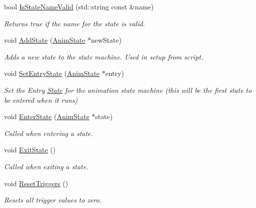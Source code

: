\begin{DoxyCompactItemize}
bool \hyperlink{classAnimatorController_ac079dc6e19c4284fa941033577ddd45d}{Is\+State\+Name\+Valid} (std\+::string const \&name)
\begin{DoxyCompactList}\small\item\em Returns true if the name for the state is valid. \end{DoxyCompactList}\item 
void \hyperlink{classAnimatorController_a7e2acba88b4bc663c3bc3a04c20962c8}{Add\+State} (\hyperlink{structAnimState}{Anim\+State} $\ast$new\+State)
\begin{DoxyCompactList}\small\item\em Adds a new state to the state machine. Used in setup from script. \end{DoxyCompactList}\item 
void \hyperlink{classAnimatorController_adec385ab87a34b0919a040b1540f8b86}{Set\+Entry\+State} (\hyperlink{structAnimState}{Anim\+State} $\ast$entry)
\begin{DoxyCompactList}\small\item\em Set the Entry \hyperlink{classState}{State} for the animation state machine (this will be the first state to be entered when it runs) \end{DoxyCompactList}\item 
void \hyperlink{classAnimatorController_a4717fb9e8e96c4cd7fff48ed38db6ae8}{Enter\+State} (\hyperlink{structAnimState}{Anim\+State} $\ast$state)
\begin{DoxyCompactList}\small\item\em Called when entering a state. \end{DoxyCompactList}\item 
\mbox{\label{classAnimatorController_a1dfd902754b35be9c44dfeb86ddc70c2}} 
void \hyperlink{classAnimatorController_a1dfd902754b35be9c44dfeb86ddc70c2}{Exit\+State} ()
\begin{DoxyCompactList}\small\item\em Called when exiting a state. \end{DoxyCompactList}\item 
\mbox{\label{classAnimatorController_a0ebaa0dc9f103ce98f5f330d6e36cb73}} 
void \hyperlink{classAnimatorController_a0ebaa0dc9f103ce98f5f330d6e36cb73}{Reset\+Triggers} ()
\begin{DoxyCompactList}\small\item\em Resets all trigger values to zero. \end{DoxyCompactList}\item 

\end{DoxyCompactItemize}
